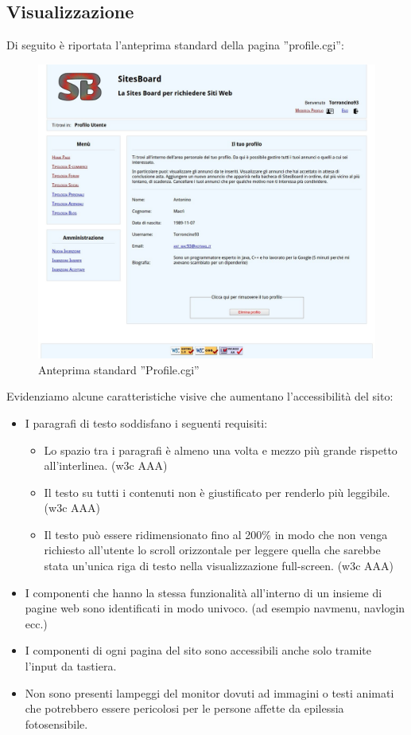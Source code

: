\documentclass[12pt]{article}
\begin{document}
	\subsection{Visualizzazione}
	Di seguito è riportata l'anteprima standard della pagina ''profile.cgi'':
	
	\begin{figure}[H]
	\centering
     		 \includegraphics[scale=0.3]{img/userProfile_SitesBoard.jpg}
		 \caption{Anteprima standard ''Profile.cgi''}
	\end{figure}
	
	Evidenziamo alcune caratteristiche visive che aumentano l'accessibilità del sito:
	
\begin{itemize}
	\item I paragrafi di testo soddisfano i seguenti requisiti:
		\begin{itemize}
		\item Lo spazio tra i paragrafi è almeno una volta e mezzo più grande rispetto all’interlinea. (w3c AAA)
		\item Il testo su tutti i contenuti non è giustificato per renderlo più leggibile. (w3c AAA)
		\item Il testo può essere ridimensionato fino al 200\% in modo che non venga richiesto all'utente lo scroll orizzontale per leggere quella che sarebbe stata un'unica riga di testo nella visualizzazione full-screen. (w3c AAA)
		\end{itemize}
	\item  I componenti che hanno la stessa funzionalità all’interno di un insieme di pagine web sono identificati in modo univoco. (ad esempio nav\textunderscore menu, nav\textunderscore login ecc.)
	\item I componenti di ogni pagina del sito sono accessibili anche solo tramite l'input da tastiera.
	\item Non sono presenti lampeggi del monitor dovuti ad immagini o testi animati che potrebbero essere pericolosi per le persone affette da epilessia fotosensibile.
\end{itemize}
	
\end{document}
